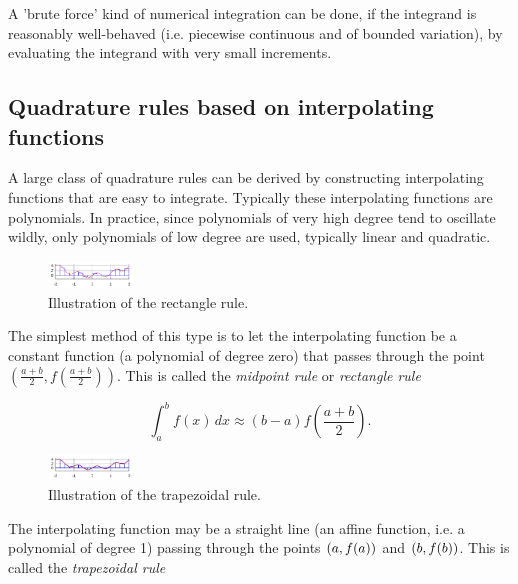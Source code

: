 \documentclass[a4paper]{article}
\begin{document}
A 'brute force' kind of numerical integration can be done, if the integrand is reasonably well-behaved (i.e. piecewise continuous and of bounded variation), by evaluating the integrand with very small increments.

\subsection{Quadrature rules based on interpolating functions}
A large class of quadrature rules can be derived by constructing interpolating functions that are easy to integrate. Typically these interpolating functions are polynomials. In practice, since polynomials of very high degree tend to oscillate wildly, only polynomials of low degree are used, typically linear and quadratic.

\begin{figure}
	\begin{center}
		\includegraphics[width=0.2\textwidth]{4}
	\end{center}
	\caption{Illustration of the rectangle rule.}
\end{figure}

The simplest method of this type is to let the interpolating function be a constant function (a polynomial of degree zero) that passes through the point $\left({\frac {a+b}{2}},f\left({\frac {a+b}{2}}\right)\right)$. This is called the \textit{midpoint rule} or \textit{rectangle rule}

\begin{equation*}
	\int _{a}^{b}f(x)\,dx\approx (b-a)f\left({\frac {a+b}{2}}\right).
\end{equation*}

\begin{figure}
	\begin{center}
		\includegraphics[width=0.2\textwidth]{5}
	\end{center}
	\caption{Illustration of the trapezoidal rule.}
\end{figure}

The interpolating function may be a straight line (an affine function, i.e. a polynomial of degree 1) passing through the points ${\displaystyle \left(a,f(a)\right)}$ and ${\displaystyle \left(b,f(b)\right)}$. This is called the \textit{trapezoidal rule}
\end{document}
